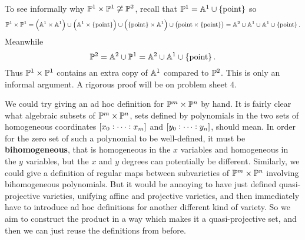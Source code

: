 \begin{example*}
To see informally why $ \PP^1 \times \PP^1 \not\cong \PP^2 $, recall that $ \PP^1 = \AA^1 \cup \cbr{\text{point}} $ so
$$ \PP^1 \times \PP^1 = \br{\AA^1 \times \AA^1} \cup \br{\AA^1 \times \cbr{\text{point}}} \cup \br{\cbr{\text{point}} \times \AA^1} \cup \br{\text{point} \times \cbr{\text{point}}} = \AA^2 \cup \AA^1 \cup \AA^1 \cup \cbr{\text{point}}. $$
Meanwhile
$$ \PP^2 = \AA^2 \cup \PP^1 = \AA^2 \cup \AA^1 \cup \cbr{\text{point}}. $$
Thus $ \PP^1 \times \PP^1 $ contains an extra copy of $ \AA^1 $ compared to $ \PP^2 $. This is only an informal argument. A rigorous proof will be on problem sheet $ 4 $.
\end{example*}

We could try giving an ad hoc definition for $ \PP^m \times \PP^n $ by hand. It is fairly clear what algebraic subsets of $ \PP^m \times \PP^n $, sets defined by polynomials in the two sets of homogeneous coordinates $ \sbr{x_0 : \dots : x_m} $ and $ \sbr{y_0 : \dots : y_n} $, should mean. In order for the zero set of such a polynomial to be well-defined, it must be \textbf{bihomogeneous}, that is homogeneous in the $ x $ variables and homogeneous in the $ y $ variables, but the $ x $ and $ y $ degrees can potentially be different. Similarly, we could give a definition of regular maps between subvarieties of $ \PP^m \times \PP^n $ involving bihomogeneous polynomials. But it would be annoying to have just defined quasi-projective varieties, unifying affine and projective varieties, and then immediately have to introduce ad hoc definitions for another different kind of variety. So we aim to construct the product in a way which makes it a quasi-projective set, and then we can just reuse the definitions from before.

\pagebreak

